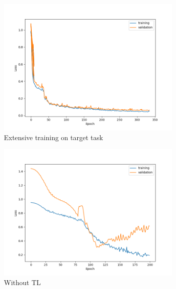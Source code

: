 \begin{figure}[ht!]
    \centering
    \begin{subfigure}{0.48\textwidth}
        \includegraphics[width=\textwidth]{./project3/figures/figure1a.png}
        \caption{Extensive training on target task} 
        \label{subfig3-1:extensive}
    \end{subfigure}\hfill
    \begin{subfigure}{0.48\textwidth}
        \includegraphics[width=\textwidth]{./project3/figures/figure1b.png}
        \caption{Without TL}
        \label{subfig3-1:without}
    \end{subfigure}
    \begin{subfigure}{0.48\textwidth}

\end{subfigure}
\end{figure}
